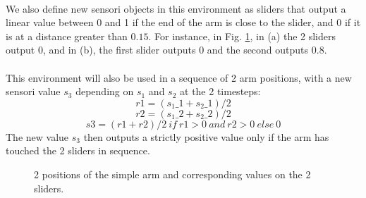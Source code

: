 \documentclass[12pt]{article}
\begin{document}
			\paragraph{}
			We also define new sensori objects in this environment as sliders that output a linear value between 0 and 1 if the end of the arm is close to the slider,
			and 0 if it is at a distance greater than $0.15$. For instance, in Fig. \ref{arms}, in (a) the 2 sliders output 0, and in (b), the first 
			slider outputs 0 and the second outputs $0.8$.
			
			\paragraph{}
			This environment will also be used in a sequence of 2 arm positions, with a new sensori value $s_3$ depending on $s_1$ and $s_2$ at the 2 timesteps:
			$$r1 = (s_1\_1 + s_2\_1)/2$$
			$$r2 = (s_1\_2 + s_2\_2)/2$$
			$$s3 = (r1+r2)/2 ~if ~r1 > 0 ~and~ r2 > 0 ~else ~0$$
			The new value $s_3$ then outputs a strictly positive value only if the arm has touched the 2 sliders in sequence.

			\begin{figure}[H]
				\centering
				\caption{2 positions of the simple arm and corresponding values on the 2 sliders.}
				\label{arms}
			\end{figure}
			
\end{document}
